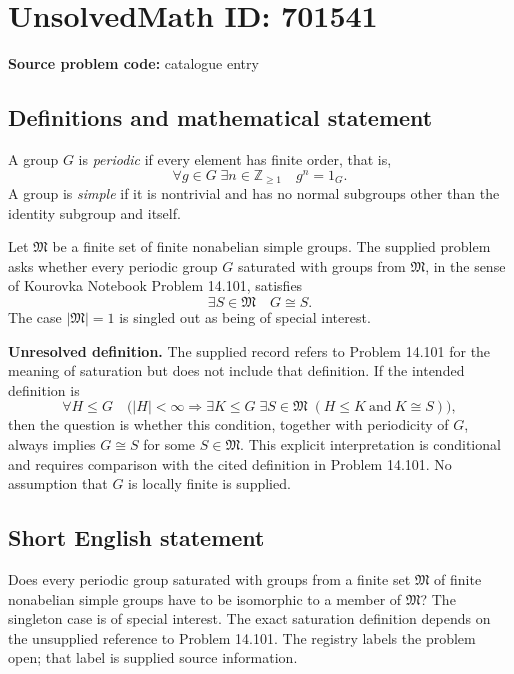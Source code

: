 \documentclass[11pt]{article}
\newcommand{\Z}{\mathbb{Z}}
\begin{document}
\section*{UnsolvedMath ID: 701541}
\textbf{Source problem code:} catalogue entry
\subsection{Definitions and mathematical statement}
A group \(G\) is \emph{periodic} if every element has finite order, that is,
\[
\forall g\in G\;\exists n\in\Z_{\geq 1}\quad g^n=1_G.
\]
A group is \emph{simple} if it is nontrivial and has no normal subgroups other than the identity subgroup and itself.

Let \(\mathfrak M\) be a finite set of finite nonabelian simple groups. The supplied problem asks whether every periodic group \(G\) saturated with groups from \(\mathfrak M\), in the sense of Kourovka Notebook Problem 14.101, satisfies
\[
\exists S\in\mathfrak M\quad G\cong S.
\]
The case \(|\mathfrak M|=1\) is singled out as being of special interest.

\textbf{Unresolved definition.} The supplied record refers to Problem 14.101 for the meaning of saturation but does not include that definition. If the intended definition is
\[
\forall H\leq G\quad
\bigl(|H|<\infty\Longrightarrow
\exists K\leq G\;\exists S\in\mathfrak M\;
(H\leq K\ \text{and}\ K\cong S)\bigr),
\]
then the question is whether this condition, together with periodicity of \(G\), always implies \(G\cong S\) for some \(S\in\mathfrak M\). This explicit interpretation is conditional and requires comparison with the cited definition in Problem 14.101. No assumption that \(G\) is locally finite is supplied.
\subsection{Short English statement}
Does every periodic group saturated with groups from a finite set \(\mathfrak M\) of finite nonabelian simple groups have to be isomorphic to a member of \(\mathfrak M\)? The singleton case is of special interest. The exact saturation definition depends on the unsupplied reference to Problem 14.101. The registry labels the problem open; that label is supplied source information.
\end{document}
